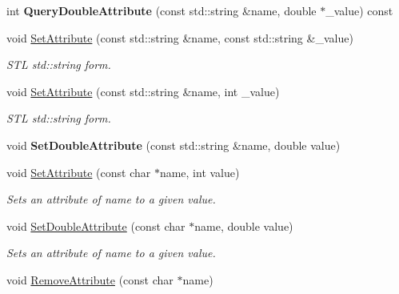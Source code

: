 \begin{DoxyCompactItemize}
\item 
int {\bfseries Query\+Double\+Attribute} (const std\+::string \&name, double $\ast$\+\_\+value) const \hypertarget{class_ti_xml_element_a157250e0c0303657d911f6991106ba73}{}\label{class_ti_xml_element_a157250e0c0303657d911f6991106ba73}

\item 
void \hyperlink{class_ti_xml_element_a80ed65b1d194c71c6c9986ae42337d7d}{Set\+Attribute} (const std\+::string \&name, const std\+::string \&\+\_\+value)
\begin{DoxyCompactList}\small\item\em S\+TL std\+::string form. \end{DoxyCompactList}\item 
void \hyperlink{class_ti_xml_element_a6f18d54fbe25bbc527936ee65363b3c5}{Set\+Attribute} (const std\+::string \&name, int \+\_\+value)\hypertarget{class_ti_xml_element_a6f18d54fbe25bbc527936ee65363b3c5}{}\label{class_ti_xml_element_a6f18d54fbe25bbc527936ee65363b3c5}

\begin{DoxyCompactList}\small\item\em S\+TL std\+::string form. \end{DoxyCompactList}\item 
void {\bfseries Set\+Double\+Attribute} (const std\+::string \&name, double value)\hypertarget{class_ti_xml_element_ac2112d423b39a93012b241f6baf4d3d3}{}\label{class_ti_xml_element_ac2112d423b39a93012b241f6baf4d3d3}

\item 
void \hyperlink{class_ti_xml_element_ace6f4be75e373726d4774073d666d1a7}{Set\+Attribute} (const char $\ast$name, int value)
\begin{DoxyCompactList}\small\item\em Sets an attribute of name to a given value. \end{DoxyCompactList}\item 
void \hyperlink{class_ti_xml_element_a0d1dd975d75496778177e35abfe0ec0b}{Set\+Double\+Attribute} (const char $\ast$name, double value)
\begin{DoxyCompactList}\small\item\em Sets an attribute of name to a given value. \end{DoxyCompactList}\item 
void \hyperlink{class_ti_xml_element_a56979767deca794376b1dfa69a525b2a}{Remove\+Attribute} (const char $\ast$name)\hypertarget{class_ti_xml_element_a56979767deca794376b1dfa69a525b2a}{}\label{class_ti_xml_element_a56979767deca794376b1dfa69a525b2a}


\end{DoxyCompactItemize}
